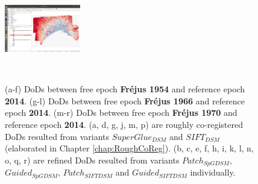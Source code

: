 \begin{figure}[htbp]
\begin{center}
{\begin{minipage}[t]{0.31\linewidth}
				\centering
				\includegraphics[width=3.3cm,trim=680 180 50 260,clip]{images/Chapitre3/DoD1970DSM-SIFT.png}
			\end{minipage}%
		}
		\\
		
		\caption{(a-f) \ac{DoD}s between free epoch \textbf{Fr{\'e}jus 1954} and reference epoch \textbf{2014}. (g-l) \ac{DoD}s between free epoch \textbf{Fr{\'e}jus 1966} and reference epoch \textbf{2014}. (m-r) \ac{DoD}s between free epoch \textbf{Fr{\'e}jus 1970} and reference epoch \textbf{2014}. (a, d, g, j, m, p) are roughly co-registered \ac{DoD}s resulted from variants $SuperGlue_{DSM}$ and $SIFT_{DSM}$ (elaborated in Chapter \ref{chap:RoughCoReg}). (b, c, e, f, h, i, k, l, n, o, q, r) are refined \ac{DoD}s resulted from variants $Patch_{SpGDSM}$, $Guided_{SpGDSM}$, $Patch_{SIFTDSM}$ and $Guided_{SIFTDSM}$ individually.}
		\label{PreciseDoDFrejus}
	\end{center}
\end{figure} 


